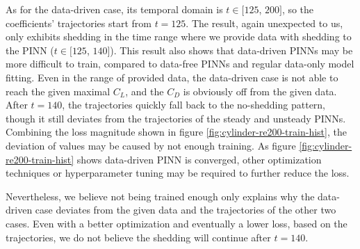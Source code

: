 As for the data-driven case, its temporal domain is $t\in[125$, $200]$, so the coefficients' trajectories start from $t=125$.
The result, again unexpected to us, only exhibits shedding in the time range where we provide data with shedding to the PINN ($t\in[125$, $140]$).
This result also shows that data-driven PINNs may be more difficult to train, compared to data-free PINNs and regular data-only model fitting.
Even in the range of provided data, the data-driven case is not able to reach the given maximal $C_L$, and the $C_D$ is obviously off from the given data.
After $t=140$, the trajectories quickly fall back to the no-shedding pattern, though it still deviates from the trajectories of the steady and unsteady PINNs.
Combining the loss magnitude shown in figure \ref{fig:cylinder-re200-train-hist}, the deviation of values may be caused by not enough training.
As figure \ref{fig:cylinder-re200-train-hist} shows data-driven PINN is converged, other optimization techniques or hyperparameter tuning may be required to further reduce the loss.

Nevertheless, we believe not being trained enough only explains why the data-driven case deviates from the given data and the trajectories of the other two cases.
Even with a better optimization and eventually a lower loss, based on the trajectories, we do not believe the shedding will continue after $t=140$.

